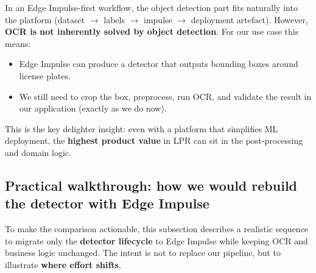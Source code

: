 \noindent
In an Edge Impulse-first workflow, the object detection part fits naturally into the platform (dataset $\rightarrow$ labels $\rightarrow$ impulse $\rightarrow$ deployment artefact).
However, \textbf{OCR is not inherently solved by object detection}.
For our use case this means:
\begin{itemize}
	\item Edge Impulse can produce a detector that outputs bounding boxes around license plates.
	\item We still need to crop the box, preprocess, run OCR, and validate the result in our application (exactly as we do now).
\end{itemize}

\noindent
This is the key delighter insight: even with a platform that simplifies ML deployment, the \textbf{highest product value} in LPR can sit in the post-processing and domain logic.

\subsection{Practical walkthrough: how we would rebuild the detector with Edge Impulse}
\label{sec:edge_impulse_walkthrough}

\noindent
To make the comparison actionable, this subsection describes a realistic sequence to migrate only the \textbf{detector lifecycle} to Edge Impulse while keeping OCR and business logic unchanged.
The intent is not to replace our pipeline, but to illustrate \textbf{where effort shifts}.

